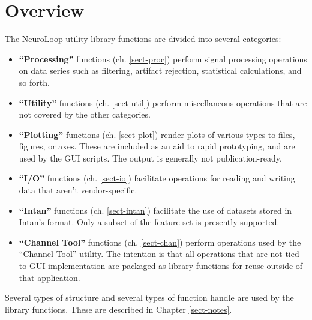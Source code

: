 
\chapter{Overview}
\label{sect-over}

The NeuroLoop utility library functions are divided into several categories:

\begin{itemize}

\item \textbf{``Processing''} functions (ch. \ref{sect-proc}) perform signal
processing operations on data series such as filtering, artifact rejection,
statistical calculations, and so forth.

\item \textbf{``Utility''} functions (ch. \ref{sect-util}) perform
miscellaneous operations that are not covered by the other categories.

\item \textbf{``Plotting''} functions (ch. \ref{sect-plot}) render plots
of various types to files, figures, or axes. These are included as an aid
to rapid prototyping, and are used by the GUI scripts. The output is
generally not publication-ready.

\item \textbf{``I/O''} functions (ch. \ref{sect-io}) facilitate operations
for reading and writing data that aren't vendor-specific.

\item \textbf{``Intan''} functions (ch. \ref{sect-intan}) facilitate the use
of datasets stored in Intan's format. Only a subset of the feature set is
presently supported.

\item \textbf{``Channel Tool''} functions (ch. \ref{sect-chan}) perform
operations used by the ``Channel Tool'' utility. The intention is that all
operations that are not tied to GUI implementation are packaged as library
functions for reuse outside of that application.

\end{itemize}

Several types of structure and several types of function handle are used by
the library functions. These are described in Chapter \ref{sect-notes}.


%
